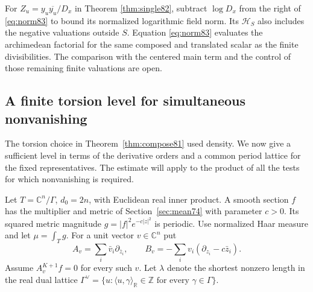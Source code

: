 \documentclass[a4paper,11pt]{article}
\theoremstyle{definition}
\theoremstyle{remark}
\newcommand{\RR}{\mathbb R}\newcommand{\CC}{\mathbb C}\newcommand{\QQ}{\mathbb Q}
\newcommand{\ZZ}{\mathbb Z}\newcommand{\ord}{\operatorname{ord}}
\numberwithin{equation}{section}
\begin{document}
For \(Z_u=y_u\overline{y_u}/D_x\) in Theorem \ref{thm:single82},
subtract \(\log D_x\) from the right of \eqref{eq:norm83} to
bound its normalized logarithmic field norm. Its \(\mathcal H_S\)
also includes the negative valuations outside \(S\). Equation
\eqref{eq:norm83} evaluates the archimedean factorial for the
same composed and translated scalar as the finite divisibilities.
The comparison with the centered main term and the control of those
remaining finite valuations are open.

\subsection{A finite torsion level for simultaneous nonvanishing}\label{nav:VI-04}
\label{sec:grid85}

The torsion choice in Theorem~\ref{thm:compose81} used density.
We now give a sufficient level in terms of the derivative orders
and a common period lattice for the fixed representatives. The
estimate will apply to the product of all the tests for which
nonvanishing is required.

Let \(T=\CC^n/\Gamma\), \(d_0=2n\), with Euclidean real inner
product. A smooth section \(f\) has the multiplier and metric
of Section~\ref{sec:mean74} with parameter \(c>0\).
Its squared metric magnitude \(g=|f|^2e^{-c|z|^2}\) is periodic.
Use normalized Haar measure and let \(\mu=\int_T g\).
For a unit vector \(v\in\CC^n\) put
\[
 A_v=\sum_i\bar v_i\partial_{\bar z_i},\qquad
 B_v=-\sum_i v_i(\partial_{z_i}-c\bar z_i).
\]
Assume \(A_v^{K+1}f=0\) for every such \(v\). Let \(\lambda\)
denote the shortest nonzero length in the real dual lattice
\(\Gamma^\vee=\{u:\langle u,\gamma\rangle_{\RR}\in\ZZ
\text{ for every }\gamma\in\Gamma\}\).
\end{document}
